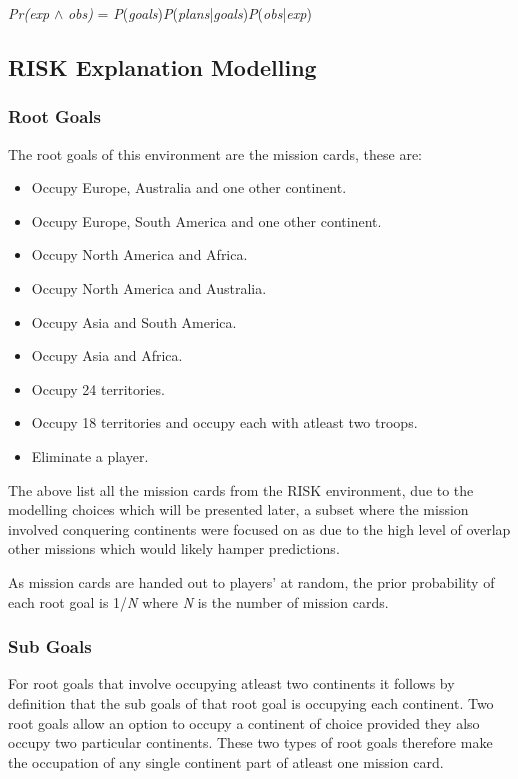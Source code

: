 \documentclass[parskip]{cs4rep}
\begin{document}
\centerline{
\textit{Pr(exp} $\wedge$ \textit{obs)} = \textit{P}(\textit{goals})\textit{P}(\textit{plans}|\textit{goals})\textit{P}(\textit{obs}|\textit{exp})
}

\subsection{RISK Explanation Modelling}

\subsubsection{Root Goals}

The root goals of this environment are the mission cards, these are:

\begin{itemize}
\item
Occupy Europe, Australia and one other continent.
\item
Occupy Europe, South America and one other continent.
\item
Occupy North America and Africa.
\item
Occupy North America and Australia.
\item
Occupy Asia and South America.
\item
Occupy Asia and Africa.
\item
Occupy 24 territories.
\item
Occupy 18 territories and occupy each with atleast two troops.
\item
Eliminate a player.
\newline
\end{itemize}

The above list all the mission cards from the RISK environment, due to the modelling choices which will be presented later, a subset where the mission involved conquering continents were focused on as due to the high level of overlap other missions which would likely hamper predictions.

As mission cards are handed out to players' at random, the prior probability of each root goal is 1/\textit{N} where \textit{N} is the number of mission cards.

\subsubsection{Sub Goals}

For root goals that involve occupying atleast two continents it follows by definition that the sub goals of that root goal is occupying each continent. Two root goals allow an option to occupy a continent of choice provided they also occupy two particular continents. These two types of root goals therefore make the occupation of any single continent part of atleast one mission card.
\end{document}
